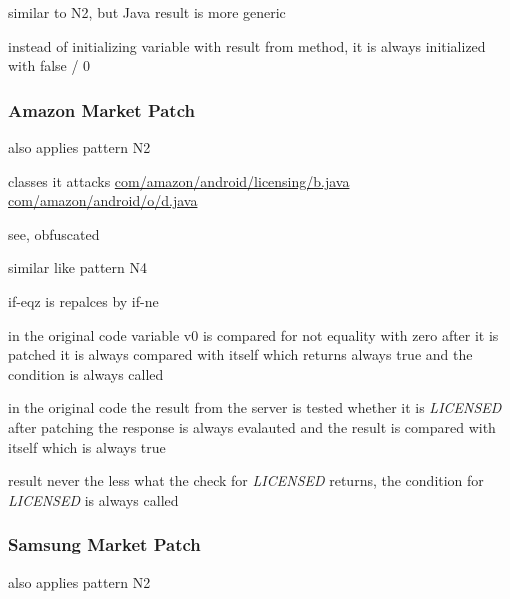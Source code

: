 similar to N2, but Java result is more generic



instead of initializing variable with result from method, it is always initialized with false / 0
\subsubsection{Amazon Market Patch}
also applies pattern N2

classes it attacks %
\url{com/amazon/android/licensing/b.java}
\url{com/amazon/android/o/d.java}

see, obfuscated

similar like pattern N4



if-eqz is repalces by if-ne


in the original code variable v0 is compared for not equality with zero
after it is patched it is always compared with itself which returns always true and the condition is always called



in the original code the result from the server is tested whether it is \textit{LICENSED}
after patching the response is always evalauted and the result is compared with itself which is always true

result
never the less what the check for \textit{LICENSED} returns, the condition for \textit{LICENSED} is always called
\subsubsection{Samsung Market Patch}
also applies pattern N2

